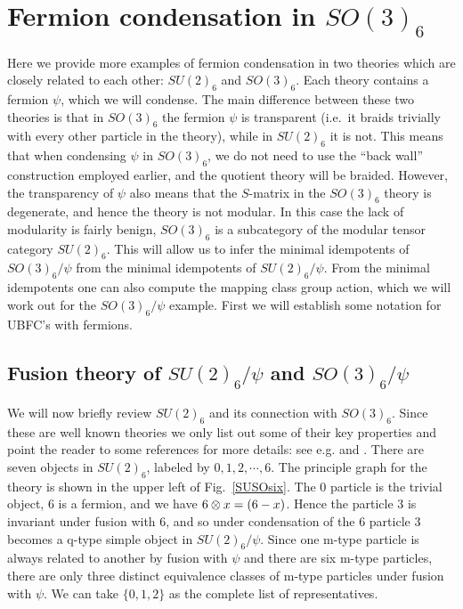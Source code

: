 

\section{Fermion condensation in $SO(3)_6$} \label{so36}

Here we provide more examples of fermion condensation in two theories which are closely related to each other:
$SU(2)_6$ and $SO(3)_6$. 
Each theory contains a fermion $\psi$, which we will condense. 
The main difference between these two theories is that in $SO(3)_6$ the fermion $\psi$ is transparent 
(i.e.\ it braids trivially with every other particle in the theory), while in $SU(2)_6$ it is not. 
This means that when condensing $\psi$ in $SO(3)_6$, we do not need to use the ``back wall'' construction employed earlier,
and the quotient theory will be braided. 
However, the transparency of $\psi$ also means that the $S$-matrix in the $SO(3)_6$ theory is degenerate, 
and hence the theory is not modular. 
In this case the lack of modularity is fairly benign, 
$SO(3)_6$ is a subcategory of the modular tensor category $SU(2)_6$.
This will allow us to infer the minimal idempotents of $SO(3)_6/\psi$ from the minimal idempotents of $SU(2)_6/\psi$.
From the minimal idempotents one can also compute the mapping class group action, which we will work out for the $SO(3)_6/\psi$ example.
First we will establish some notation for UBFC's with fermions.




\subsection{Fusion theory of $SU(2)_6/\psi$ and $SO(3)_6/\psi$}

We will now briefly review $SU(2)_6$ and its connection with $SO(3)_6$.
Since these are well known theories we only list out some of their key properties and point the 
reader to some references for more details: see e.g. \cite{kirillow1989} and \cite{Bonderson2007}.
There are seven objects in $SU(2)_6$, labeled by $0,1,2,\cdots, 6$.
The principle graph for the theory is shown in the upper left of Fig.~\ref{SUSOsix}. 
The $0$ particle is the trivial object, $6$ is a fermion, and we have $6 \otimes x = (6-x)$. 
Hence the particle $3$ is invariant under fusion with $6$, and so under condensation of the $6$ 
particle $3$ becomes a q-type simple object in $SU(2)_6/\psi$.
Since one m-type particle is always related to another by fusion with $\psi$ and 
there are six m-type particles, there are only three distinct equivalence classes of m-type
particles under fusion with $\psi$. 
We can take $\{0,1,2\}$ as the complete list of representatives.


